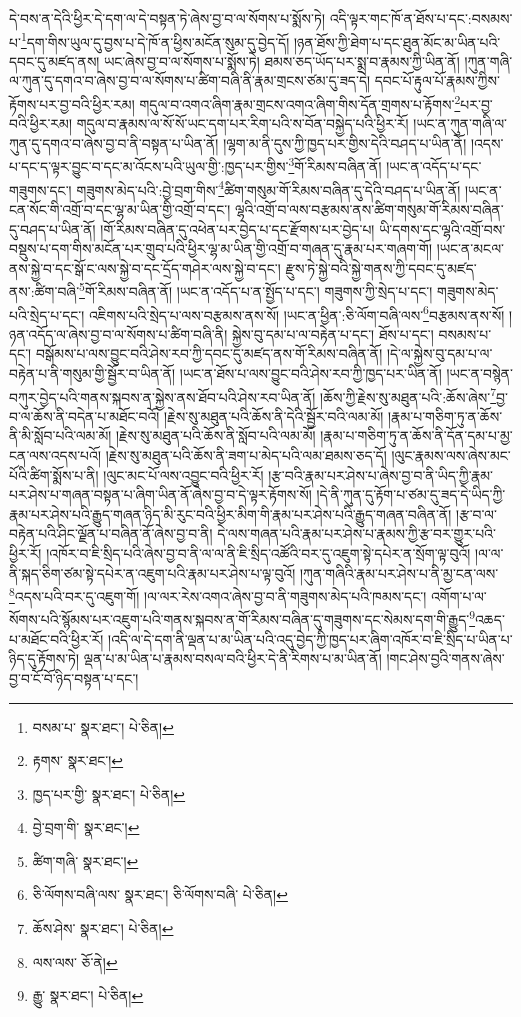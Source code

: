 དེ་བས་ན་དེའི་ཕྱིར་དེ་དག་ལ་དེ་བསྟན་ཏེ་ཞེས་བྱ་བ་ལ་སོགས་པ་སྨོས་ཏེ། འདི་ལྟར་གང་ཁོ་ན་ཐོས་པ་དང་:བསམས་པ་\footnote{བསམ་པ་  སྣར་ཐང་།  པེ་ཅིན། }དག་གིས་ཡུལ་དུ་བྱས་པ་དེ་ཁོ་ན་ཕྱིས་མངོན་སུམ་དུ་བྱེད་དོ། །ཉན་ཐོས་ཀྱི་ཐེག་པ་དང་ཐུན་མོང་མ་ཡིན་པའི་དབང་དུ་མཛད་ནས། ཡང་ཞེས་བྱ་བ་ལ་སོགས་པ་སྨོས་ཏེ། ཐམས་ཅད་ཡོད་པར་སྨྲ་བ་རྣམས་ཀྱི་ཡིན་ནོ། །ཀུན་གཞི་ལ་ཀུན་དུ་དགའ་བ་ཞེས་བྱ་བ་ལ་སོགས་པ་ཚིག་བཞི་ནི་རྣམ་གྲངས་ཙམ་དུ་ཟད་དེ། དབང་པོ་རྟུལ་པོ་རྣམས་ཀྱིས་རྟོགས་པར་བྱ་བའི་ཕྱིར་རམ། གདུལ་བ་འགའ་ཞིག་རྣམ་གྲངས་འགའ་ཞིག་གིས་དོན་གྲགས་པ་རྟོགས་\footnote{རྟགས་  སྣར་ཐང་། }པར་བྱ་བའི་ཕྱིར་རམ། གདུལ་བ་རྣམས་ལ་སོ་སོ་ཡང་དག་པར་རིག་པའི་ས་བོན་བསྐྱེད་པའི་ཕྱིར་རོ། །ཡང་ན་ཀུན་གཞི་ལ་ཀུན་དུ་དགའ་བ་ཞེས་བྱ་བ་ནི་བསྟན་པ་ཡིན་ནོ། །ལྷག་མ་ནི་དུས་ཀྱི་ཁྱད་པར་གྱིས་དེའི་བཤད་པ་ཡིན་ནོ། །འདས་པ་དང་ད་ལྟར་བྱུང་བ་དང་མ་འོངས་པའི་ཡུལ་གྱི་:ཁྱད་པར་གྱིས་\footnote{ཁྱད་པར་གྱི་  སྣར་ཐང་།  པེ་ཅིན། }གོ་རིམས་བཞིན་ནོ། །ཡང་ན་འདོད་པ་དང་གཟུགས་དང་། གཟུགས་མེད་པའི་:བྱེ་བྲག་གིས་\footnote{བྱེ་བྲག་གི་  སྣར་ཐང་། }ཚིག་གསུམ་གོ་རིམས་བཞིན་དུ་དེའི་བཤད་པ་ཡིན་ནོ། །ཡང་ན་ངན་སོང་གི་འགྲོ་བ་དང་ལྷ་མ་ཡིན་གྱི་འགྲོ་བ་དང་། ལྷའི་འགྲོ་བ་ལས་བརྩམས་ནས་ཚིག་གསུམ་གོ་རིམས་བཞིན་དུ་བཤད་པ་ཡིན་ནོ། །གོ་རིམས་བཞིན་དུ་འཕེན་པར་བྱེད་པ་དང་རྫོགས་པར་བྱེད་པ། ཡི་དགས་དང་ལྷའི་འགྲོ་བས་བསྡུས་པ་དག་གིས་མངོན་པར་གྲུབ་པའི་ཕྱིར་ལྷ་མ་ཡིན་གྱི་འགྲོ་བ་གཞན་དུ་རྣམ་པར་གཞག་གོ། །ཡང་ན་མངལ་ནས་སྐྱེ་བ་དང་སྒོ་ང་ལས་སྐྱེ་བ་དང་དྲོད་གཤེར་ལས་སྐྱེ་བ་དང་། རྫུས་ཏེ་སྐྱེ་བའི་སྐྱེ་གནས་ཀྱི་དབང་དུ་མཛད་ནས་:ཚིག་བཞི་\footnote{ཚིག་གཞི་  སྣར་ཐང་། }གོ་རིམས་བཞིན་ནོ། །ཡང་ན་འདོད་པ་ན་སྤྱོད་པ་དང་། གཟུགས་ཀྱི་སྲེད་པ་དང་། གཟུགས་མེད་པའི་སྲེད་པ་དང་། འཇིགས་པའི་སྲེད་པ་ལས་བརྩམས་ནས་སོ། །ཡང་ན་ཕྱིན་:ཅི་ལོག་བཞི་ལས་\footnote{ཅི་ལོགས་བཞི་ལས་  སྣར་ཐང་། ཅི་ལོགས་བཞི་  པེ་ཅིན། }བརྩམས་ནས་སོ། །ཉན་འདོད་ལ་ཞེས་བྱ་བ་ལ་སོགས་པ་ཚིག་བཞི་ནི། སྐྱེས་བུ་དམ་པ་ལ་བརྟེན་པ་དང་། ཐོས་པ་དང་། བསམས་པ་དང་། བསྒོམས་པ་ལས་བྱུང་བའི་ཤེས་རབ་ཀྱི་དབང་དུ་མཛད་ནས་གོ་རིམས་བཞིན་ནོ། །དེ་ལ་སྐྱེས་བུ་དམ་པ་ལ་བརྟེན་པ་ནི་གསུམ་གྱི་སྦྱོར་བ་ཡིན་ནོ། །ཡང་ན་ཐོས་པ་ལས་བྱུང་བའི་ཤེས་རབ་ཀྱི་ཁྱད་པར་ཡིན་ནོ། །ཡང་ན་བསྙེན་བཀུར་བྱེད་པའི་གནས་སྐབས་ན་སྐྱེས་ནས་ཐོབ་པའི་ཤེས་རབ་ཡིན་ནོ། །ཆོས་ཀྱི་རྗེས་སུ་མཐུན་པའི་:ཆོས་ཞེས་\footnote{ཆོས་ཤེས་  སྣར་ཐང་།  པེ་ཅིན། }བྱ་བ་ལ་ཆོས་ནི་བདེན་པ་མཐོང་བའོ། །རྗེས་སུ་མཐུན་པའི་ཆོས་ནི་དེའི་སྦྱོར་བའི་ལམ་མོ། །རྣམ་པ་གཅིག་ཏུ་ན་ཆོས་ནི་མི་སློབ་པའི་ལམ་མོ། །རྗེས་སུ་མཐུན་པའི་ཆོས་ནི་སློབ་པའི་ལམ་མོ། །རྣམ་པ་གཅིག་ཏུ་ན་ཆོས་ནི་དོན་དམ་པ་མྱ་ངན་ལས་འདས་པའོ། །རྗེས་སུ་མཐུན་པའི་ཆོས་ནི་ཟག་པ་མེད་པའི་ལམ་ཐམས་ཅད་དོ། །ལུང་རྣམས་ལས་ཞེས་མང་པོའི་ཚིག་སྨོས་པ་ནི། །ལུང་མང་པོ་ལས་འབྱུང་བའི་ཕྱིར་རོ། །རྩ་བའི་རྣམ་པར་ཤེས་པ་ཞེས་བྱ་བ་ནི་ཡིད་ཀྱི་རྣམ་པར་ཤེས་པ་གཞན་བསྟན་པ་ཞིག་ཡིན་ནོ་ཞེས་བྱ་བ་དེ་ལྟར་རྟོགས་སོ། །དེ་ནི་ཀུན་དུ་རྟོག་པ་ཙམ་དུ་ཟད་དེ་ཡིད་ཀྱི་རྣམ་པར་ཤེས་པའི་རྒྱུད་གཞན་ཉིད་མི་རུང་བའི་ཕྱིར་མིག་གི་རྣམ་པར་ཤེས་པའི་རྒྱུད་གཞན་བཞིན་ནོ། །རྩ་བ་ལ་བརྟེན་པའི་ཤིང་ལྗོན་པ་བཞིན་ནོ་ཞེས་བྱ་བ་ནི། དེ་ལས་གཞན་པའི་རྣམ་པར་ཤེས་པ་རྣམས་ཀྱི་རྩ་བར་གྱུར་པའི་ཕྱིར་རོ། །འཁོར་བ་ཇི་སྲིད་པའི་ཞེས་བྱ་བ་ནི་ལ་ལ་ནི་ཇི་སྲིད་འཚོའི་བར་དུ་འཇུག་སྟེ་དཔེར་ན་སྲོག་ལྟ་བུའོ། །ལ་ལ་ནི་སྐད་ཅིག་ཙམ་སྟེ་དཔེར་ན་འཇུག་པའི་རྣམ་པར་ཤེས་པ་ལྟ་བུའོ། །ཀུན་གཞིའི་རྣམ་པར་ཤེས་པ་ནི་མྱ་ངན་ལས་\footnote{ལས་ལས་  ཅོ་ནེ། }འདས་པའི་བར་དུ་འཇུག་གོ། །ལ་ལར་རེས་འགའ་ཞེས་བྱ་བ་ནི་གཟུགས་མེད་པའི་ཁམས་དང་། འགོག་པ་ལ་སོགས་པའི་སྙོམས་པར་འཇུག་པའི་གནས་སྐབས་ན་གོ་རིམས་བཞིན་དུ་གཟུགས་དང་སེམས་དག་གི་རྒྱུད་\footnote{རྒྱུ་  སྣར་ཐང་།  པེ་ཅིན། }འཆད་པ་མཐོང་བའི་ཕྱིར་རོ། །འདི་ལ་དེ་དག་ནི་ལྡན་པ་མ་ཡིན་པའི་འདུ་བྱེད་ཀྱི་ཁྱད་པར་ཞིག་འཁོར་བ་ཇི་སྲིད་པ་ཡིན་པ་ཉིད་དུ་རྟོགས་ཏེ། ལྡན་པ་མ་ཡིན་པ་རྣམས་བསལ་བའི་ཕྱིར་དེ་ནི་རིགས་པ་མ་ཡིན་ནོ། །གང་ཤེས་བྱའི་གནས་ཞེས་བྱ་བ་ངོ་བོ་ཉིད་བསྟན་པ་དང་། 